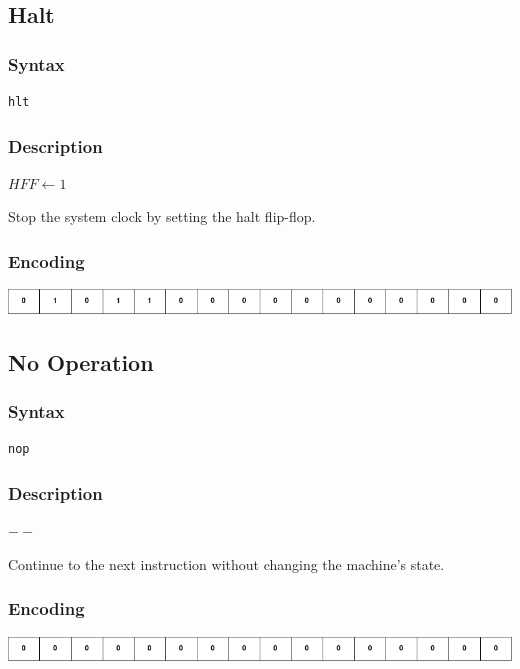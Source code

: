 \pagebreak
\subsection{Halt}\label{subsec:halt}
    \subsubsection{Syntax}
    \begin{verbatim}hlt\end{verbatim}
    \subsubsection{Description}
    $HFF \leftarrow 1$
    \par Stop the system clock by setting the halt flip-flop.
    \subsubsection{Encoding}
    \begin{center}
        \includegraphics[scale=0.40]{img/Andromeda-HLT.drawio}
    \end{center}

\subsection{No Operation}\label{subsec:nop}
    \subsubsection{Syntax}
    \begin{verbatim}nop\end{verbatim}
    \subsubsection{Description}
    $ -- $
    \par Continue to the next instruction without changing the machine's state.
    \subsubsection{Encoding}
    \begin{center}
        \includegraphics[scale=0.40]{img/Andromeda-NOP.drawio}
    \end{center}

